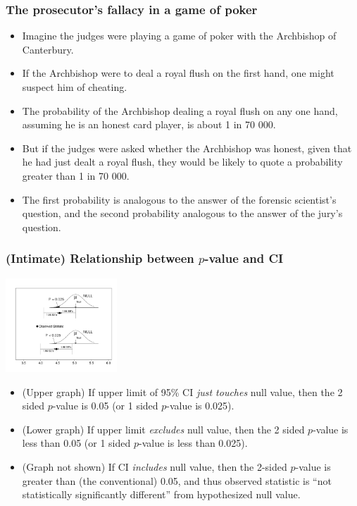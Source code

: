 \documentclass[handout]{beamer}\usepackage[]{graphicx}\usepackage[]{color}
\begin{document}
\begin{frame}
\frametitle{The prosecutor's fallacy in a game of poker}

\begin{itemize}
		\setlength\itemsep{1em}
		\item  Imagine the judges were playing a game of poker with the Archbishop of Canterbury. 
		\item If the Archbishop were to deal a royal flush on the first hand, one might suspect him of cheating. 
		\item The probability of the Archbishop dealing a royal flush on any one hand, assuming he is an honest card player, is about 1 in 70 000. 
		\item But if the judges were asked whether the Archbishop was honest, given that he had just dealt a royal flush, they would be likely to quote a probability greater than 1 in 70 000. \pause 
		\item The first probability is analogous to the answer of the forensic scientist's
		question, and the second probability analogous to the answer of the jury's
		question. 
\end{itemize}

\end{frame}


\begin{frame}
\frametitle{(Intimate) Relationship between $p$-value and CI}
\begin{center}
\includegraphics[width=1.65in]{P-CI.pdf}
\end{center} 
\begin{footnotesize}
\begin{itemize}
\item
(Upper graph) If upper limit of 95\% CI\textit{ just touches} null value, then
the 2 sided $p$-value is 0.05 (or 1 sided $p$-value is 0.025). \pause
\item
(Lower graph) If upper limit \textit{excludes} null value, then
the 2 sided $p$-value is less than 0.05 (or 1 sided $p$-value is less than 0.025). \pause
\item
(Graph not shown) If  CI \textit{includes} null value, then the 2-sided $p$-value is greater than (the conventional) 0.05, and thus observed statistic is ``not statistically significantly different'' from hypothesized null value. 
\end{itemize}
\end{footnotesize}
\end{frame}
\end{document}
